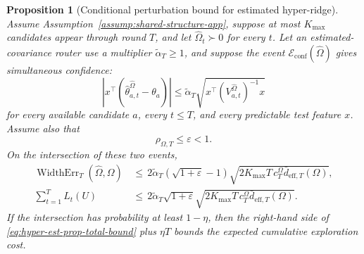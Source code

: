 \documentclass{article} %
\newtheorem{proposition}[theorem]{Proposition}
\begin{document}
\begin{proposition}[Conditional perturbation bound for estimated hyper-ridge]
\label{prop:hyper-estimated-perturbation}
Assume Assumption~\ref{assump:shared-structure-app}, suppose at most
\(K_{\max}\) candidates appear through round \(T\), and let
\(\widehat\Omega_t\succ0\) for every \(t\). Let an estimated-covariance router
use a multiplier \(\widetilde\alpha_T\ge1\), and suppose the event
\(\mathcal E_{\mathrm{conf}}(\widehat\Omega)\) gives simultaneous confidence:
\begin{equation}
\label{eq:hyper-est-prop-confidence}
\left|
x^\top
\left(
\widehat\theta_{a,t}^{\widehat\Omega}-\theta_a
\right)
\right|
\le
\widetilde\alpha_T
\sqrt{
x^\top
\left(V_{a,t}^{\widehat\Omega}\right)^{-1}
x
}
\end{equation}
for every available candidate \(a\), every \(t\le T\), and every predictable
test feature \(x\). Assume also that
\begin{equation}
\label{eq:hyper-est-prop-rho}
\rho_{\Omega,T}\le \varepsilon<1 .
\end{equation}
On the intersection of these two events,
\begin{align}
\operatorname{WidthErr}_T(\widehat{\Omega},\Omega)
&\,\leq\,
2\widetilde\alpha_T
\left(\sqrt{1+\varepsilon}-1\right)
\sqrt{
2K_{\max}T\,c_T^\Omega
\bar d_{\mathrm{eff},T}(\Omega)
},
\label{eq:hyper-est-prop-err-bound}
\\
\sum_{t=1}^{T}L_t(U)
&\,\leq\,
2\widetilde\alpha_T\sqrt{1+\varepsilon}
\sqrt{
2K_{\max}T\,c_T^\Omega
\bar d_{\mathrm{eff},T}(\Omega)
}.
\label{eq:hyper-est-prop-total-bound}
\end{align}
If the intersection has probability at least \(1-\eta\), then the right-hand
side of \eqref{eq:hyper-est-prop-total-bound} plus \(\eta T\) bounds the
expected cumulative exploration cost.
\end{proposition}
\end{document}
